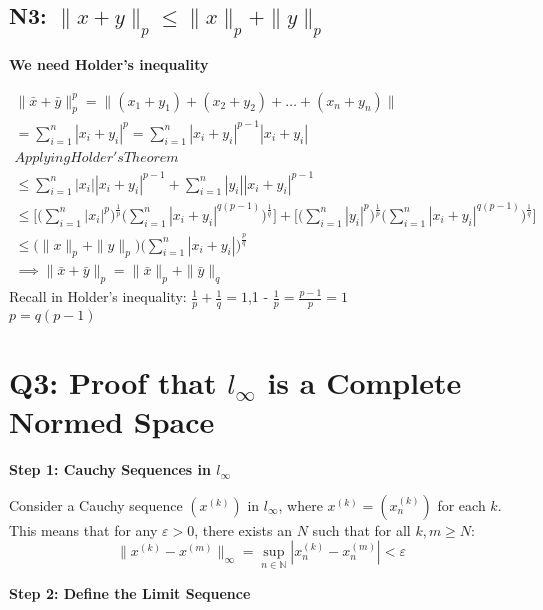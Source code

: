 \documentclass[12pt]{article}
\begin{document}
\subsection*{N3: $\| x+ y \|_{p} \leq  \| x \|_{p} + \|y\|_{p} $} 
\textbf{We need Holder's inequality}

\begin{center}
    \begin{eqnarray*}
      \|\bar{x} + \bar{y}\|_{p}^{p} = \|(x_{1}+ y_{1}) + (x_{2}+ y_{2}) + \dots +(x_{n}+ y_{n})\| \\
      = \sum_{i = 1}^{n}|x_{i} + y_{i}|^{p}  = \sum_{i = 1}^{n}|x_{i} + y_{i}|^{p-1} |x_{i} + y_{i}|\\  
      Applying Holder's Theorem \\
      \leq \sum_{i = 1}^{n}|x_{i}||x_{i} + y_{i}|^{p-1} + \sum_{i = 1}^{n}|y_{i}||x_{i} + y_{i}|^{p-1} \\
      \leq \biggl[\big(\sum_{i = 1}^{n}|x_{i}|^{p}\big)^\frac{1}{p}\big(\sum_{i = 1}^{n}|x_{i}+ y_{i}|^{q(p-1)} \big)^{\frac{1}{q}}\biggr] +  \biggl[\big(\sum_{i = 1}^{n}|y_{i}|^{p}\big)^\frac{1}{p}\big(\sum_{i = 1}^{n}|x_{i}+ y_{i}|^{q(p-1)} \big)^{\frac{1}{q}}\biggr] \\
      \leq \Biggl(\|x\|_{p} + \|y\|_{p}\Biggr)\Biggl(\sum_{i = 1}^{n}|x_{i}+ y_{i}| \Biggr)^{\frac{p}{q}} \\
      \implies \|\bar{x} + \bar{y}\|_{p} = \|\bar{x}\|_{p} + \|\bar{y}\|_{q}
    \end{eqnarray*}
Recall in Holder's inequality: $\frac{1}{p} + \frac{1}{q} = 1$,1 - $\frac{1}{p} =  \frac{p-1}{p} = 1$ \\

$p = q(p-1)$




\end{center}


\section{Q3: Proof that $l_\infty$ is a Complete Normed Space}

\textbf{Step 1: Cauchy Sequences in $l_\infty$}

Consider a Cauchy sequence $(x^{(k)})$ in $l_\infty$, where $x^{(k)} = (x_n^{(k)})$ for each $k$. This means that for any $\varepsilon > 0$, there exists an $N$ such that for all $k, m \geq N$:
\[ \|x^{(k)} - x^{(m)}\|_\infty = \sup_{n \in \mathbb{N}} |x_n^{(k)} - x_n^{(m)}| < \varepsilon \]

\textbf{Step 2: Define the Limit Sequence}
\end{document}
